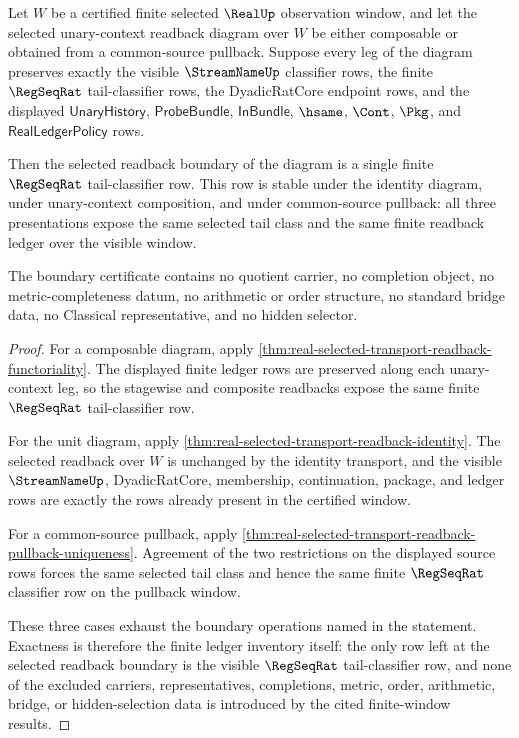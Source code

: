 \begin{theorem}\label{thm:real-selected-transport-readback-boundary-certificate}
Let $W$ be a certified finite selected $\RealUp$ observation window, and let
the selected unary-context readback diagram over $W$ be either composable or
obtained from a common-source pullback. Suppose every leg of the diagram
preserves exactly the visible $\StreamNameUp$ classifier rows, the finite
$\RegSeqRat$ tail-classifier rows, the DyadicRatCore endpoint rows, and the
displayed $\mathsf{UnaryHistory}$, $\mathsf{ProbeBundle}$,
$\mathsf{InBundle}$, $\hsame$, $\Cont$, $\Pkg$, and
$\mathsf{RealLedgerPolicy}$ rows.

Then the selected readback boundary of the diagram is a single finite
$\RegSeqRat$ tail-classifier row. This row is stable under the identity
diagram, under unary-context composition, and under common-source pullback:
all three presentations expose the same selected tail class and the same
finite readback ledger over the visible window.

The boundary certificate contains no quotient carrier, no completion object,
no metric-completeness datum, no arithmetic or order structure, no standard
bridge data, no Classical representative, and no hidden selector.
\end{theorem}
\begin{proof}
For a composable diagram, apply
\autoref{thm:real-selected-transport-readback-functoriality}. The displayed
finite ledger rows are preserved along each unary-context leg, so the
stagewise and composite readbacks expose the same finite $\RegSeqRat$
tail-classifier row.

For the unit diagram, apply
\autoref{thm:real-selected-transport-readback-identity}. The selected
readback over $W$ is unchanged by the identity transport, and the visible
$\StreamNameUp$, DyadicRatCore, membership, continuation, package, and ledger
rows are exactly the rows already present in the certified window.

For a common-source pullback, apply
\autoref{thm:real-selected-transport-readback-pullback-uniqueness}. Agreement
of the two restrictions on the displayed source rows forces the same selected
tail class and hence the same finite $\RegSeqRat$ classifier row on the
pullback window.

These three cases exhaust the boundary operations named in the statement.
Exactness is therefore the finite ledger inventory itself: the only row left
at the selected readback boundary is the visible $\RegSeqRat$ tail-classifier
row, and none of the excluded carriers, representatives, completions,
metric, order, arithmetic, bridge, or hidden-selection data is introduced by
the cited finite-window results.
\end{proof}

